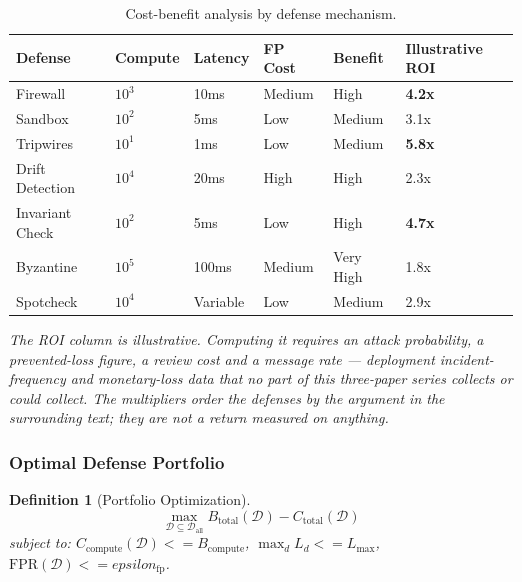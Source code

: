 \documentclass[
]{article}
\newtheorem{definition}{Definition}[section]
\begin{document}
\begin{table}[htbp]
\centering
\caption{Cost-benefit analysis by defense mechanism.}
\label{tab:cost-benefit}
\begin{tabular}{@{}llllll@{}}
\toprule
Defense & Compute & Latency & FP Cost & Benefit & Illustrative ROI \\
\midrule
Firewall & $10^3$ & 10ms & Medium & High & \textbf{4.2x} \\
Sandbox & $10^2$ & 5ms & Low & Medium & 3.1x \\
Tripwires & $10^1$ & 1ms & Low & Medium & \textbf{5.8x} \\
Drift Detection & $10^4$ & 20ms & High & High & 2.3x \\
Invariant Check & $10^2$ & 5ms & Low & High & \textbf{4.7x} \\
Byzantine & $10^5$ & 100ms & Medium & Very High & 1.8x \\
Spotcheck & $10^4$ & Variable & Low & Medium & 2.9x \\
\bottomrule
\end{tabular}

\vspace{0.5em}
\footnotesize\textit{The ROI column is illustrative. Computing it requires an attack probability, a prevented-loss figure, a review cost and a message rate --- deployment incident-frequency and monetary-loss data that no part of this three-paper series collects or could collect. The multipliers order the defenses by the argument in the surrounding text; they are not a return measured on anything.}
\end{table}

\subsubsection{Optimal Defense
Portfolio}\label{optimal-defense-portfolio}

\begin{definition}[Portfolio Optimization]
\label{def:portfolio-opt}
\begin{equation}
\label{eq:portfolio-opt}
\max_{\mathcal{D} \subseteq \mathcal{D}_{\text{all}}} B_{\text{total}}(\mathcal{D}) - C_{\text{total}}(\mathcal{D})
\end{equation}
subject to: $C_{\text{compute}}(\mathcal{D}) <= B_{\text{compute}}$, $\max_d L_d <= L_{\max}$, $\text{FPR}(\mathcal{D}) <= epsilon_{\text{fp}}$.
\end{definition}
\end{document}
